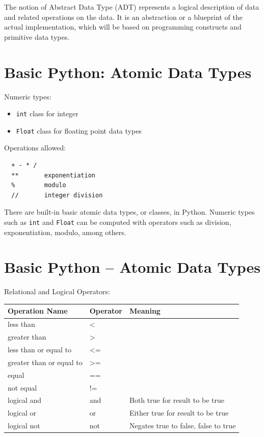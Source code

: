 \documentclass[
  letterpaper,
]{scrbook}
\newcounter{none} %
\providecommand{\tightlist}{%
  \setlength{\itemsep}{0pt}\setlength{\parskip}{0pt}}
\begin{document}
The notion of Abstract Data Type (ADT) represents a logical description
of data and related operations on the data. It is an abstraction or a
blueprint of the actual implementation, which will be based on
programming constructs and primitive data types.

\section*{Basic Python: Atomic Data
Types}\label{basic-python-atomic-data-types}


Numeric types:

\begin{itemize}
\tightlist
\item
  \texttt{int} class for integer
\item
  \texttt{Float} class for floating point data types
\end{itemize}

Operations allowed:

\begin{verbatim}
  + - * / 
  **       exponentiation
  %        modulo
  //       integer division
\end{verbatim}

There are built-in basic atomic data types, or classes, in Python.
Numeric types such as \texttt{int} and \texttt{Float} can be computed
with operators such as division, exponentiation, modulo, among others.

\section*{Basic Python -- Atomic Data
Types}\label{basic-python-atomic-data-types-1}


Relational and Logical Operators:

{\def\LTcaptype{none} %
\begin{longtable}[]{@{}lll@{}}
\toprule\noalign{}
Operation Name & Operator & Meaning \\
\midrule\noalign{}
\endhead
\bottomrule\noalign{}
\endlastfoot
less than & \textless{} & \\
greater than & \textgreater{} & \\
less than or equal to & \textless= & \\
greater than or equal to & \textgreater= & \\
equal & == & \\
not equal & != & \\
logical and & and & Both true for result to be true \\
logical or & or & Either true for result to be true \\
logical not & not & Negates true to false, false to true \\
\end{longtable}
}
\end{document}

